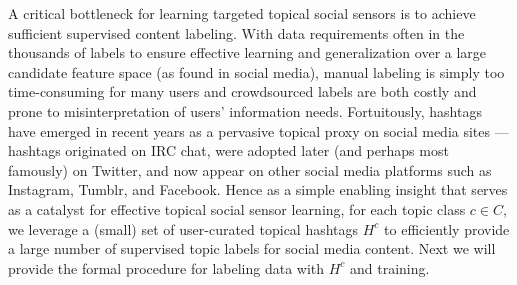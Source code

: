 A critical bottleneck for learning targeted topical social sensors
is to achieve sufficient supervised content labeling.  With data
requirements often in the thousands of labels to ensure effective
learning and generalization over a large candidate feature space (as
found in social media), manual labeling is simply too time-consuming
for many users and crowdsourced labels are both costly and prone to
misinterpretation of users' information needs.  Fortuitously, hashtags
have emerged in recent years as a pervasive topical proxy on social
media sites --- hashtags originated on IRC chat, were adopted later
(and perhaps most famously) on Twitter, and now appear on other social
media platforms such as Instagram, Tumblr, and Facebook.  Hence as a
simple enabling insight that serves as a catalyst for effective
topical social sensor learning, for each topic class $c \in C$, we leverage a (small) set of
user-curated topical hashtags $H^c$ to efficiently provide a large number of
supervised topic labels for social media content.  Next we will provide
the formal procedure for labeling data with $H^c$ and training.


